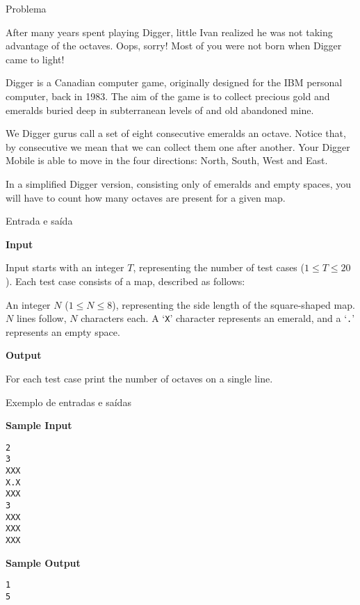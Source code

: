 
\begin{frame}[fragile]{Problema}

After many years spent playing Digger, little Ivan realized he was not taking advantage of the octaves. Oops, sorry! Most of you were not born when Digger came to light!

Digger is a Canadian computer game, originally designed for the IBM personal computer, back in 1983. The aim of the game is to collect precious gold and emeralds buried deep in subterranean levels of and old abandoned mine.

We Digger gurus call a set of eight consecutive emeralds an octave. Notice that, by consecutive we mean that we can collect them one after another. Your Digger Mobile is able to move in the four directions: North, South, West and East.

In a simplified Digger version, consisting only of emeralds and empty spaces, you will have to count how many octaves are present for a given map.

\end{frame}

\begin{frame}[fragile]{Entrada e saída}

\textbf{Input}

Input starts with an integer $T$, representing the number of test cases ($1\leq T\leq 20$). Each 
test case consists of a map, described as follows:

An integer $N$ ($1\leq N\leq 8$), representing the side length of the square-shaped map. $N$ lines 
follow, $N$ characters each. A `\texttt{X}' character represents an emerald, and a `\texttt{.}' 
represents an empty space.

\vspace{0.2in}

\textbf{Output}

For each test case print the number of octaves on a single line.

\end{frame}

\begin{frame}[fragile]{Exemplo de entradas e saídas}

\begin{minipage}[t]{0.45\textwidth}
\textbf{Sample Input}
\begin{verbatim}
2
3
XXX
X.X
XXX
3
XXX
XXX
XXX
\end{verbatim}
\end{minipage}
\begin{minipage}[t]{0.5\textwidth}
\textbf{Sample Output}
\begin{verbatim}
1
5
\end{verbatim}
\end{minipage}
\end{frame}


